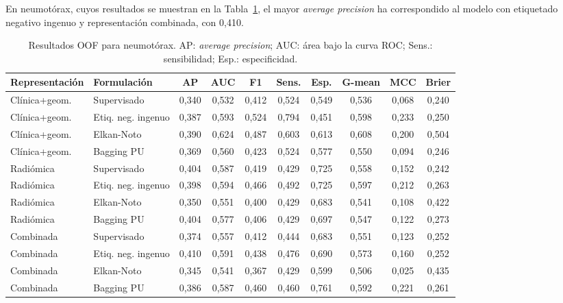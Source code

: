 En neumotórax, cuyos resultados se muestran en la Tabla~\ref{tab:pu_resultados_neumotorax}, el mayor \textit{average precision} ha correspondido al modelo con etiquetado negativo ingenuo y representación combinada, con 0,410.

\begin{table}[!htbp]
\centering
\caption{Resultados OOF para neumotórax. AP: \textit{average precision}; AUC: área bajo la curva ROC; Sens.: sensibilidad; Esp.: especificidad.}
\label{tab:pu_resultados_neumotorax}
\scriptsize
\begin{adjustbox}{max width=\textwidth}
\begin{tabular}{llcccccccc}
\toprule
\textbf{Representación} & \textbf{Formulación} & \textbf{AP} & \textbf{AUC} & \textbf{F1} & \textbf{Sens.} & \textbf{Esp.} & \textbf{G-mean} & \textbf{MCC} & \textbf{Brier} \\
\midrule
Clínica+geom. & Supervisado & 0,340 & 0,532 & 0,412 & 0,524 & 0,549 & 0,536 & 0,068 & 0,240 \\
Clínica+geom. & Etiq. neg. ingenuo & 0,387 & 0,593 & 0,524 & 0,794 & 0,451 & 0,598 & 0,233 & 0,250 \\
Clínica+geom. & Elkan-Noto & 0,390 & 0,624 & 0,487 & 0,603 & 0,613 & 0,608 & 0,200 & 0,504 \\
Clínica+geom. & Bagging PU & 0,369 & 0,560 & 0,423 & 0,524 & 0,577 & 0,550 & 0,094 & 0,246 \\
\midrule
Radiómica & Supervisado & 0,404 & 0,587 & 0,419 & 0,429 & 0,725 & 0,558 & 0,152 & 0,242 \\
Radiómica & Etiq. neg. ingenuo & 0,398 & 0,594 & 0,466 & 0,492 & 0,725 & 0,597 & 0,212 & 0,263 \\
Radiómica & Elkan-Noto & 0,350 & 0,551 & 0,400 & 0,429 & 0,683 & 0,541 & 0,108 & 0,422 \\
Radiómica & Bagging PU & 0,404 & 0,577 & 0,406 & 0,429 & 0,697 & 0,547 & 0,122 & 0,273 \\
\midrule
Combinada & Supervisado & 0,374 & 0,557 & 0,412 & 0,444 & 0,683 & 0,551 & 0,123 & 0,252 \\
Combinada & Etiq. neg. ingenuo & 0,410 & 0,591 & 0,438 & 0,476 & 0,690 & 0,573 & 0,160 & 0,252 \\
Combinada & Elkan-Noto & 0,345 & 0,541 & 0,367 & 0,429 & 0,599 & 0,506 & 0,025 & 0,435 \\
Combinada & Bagging PU & 0,386 & 0,587 & 0,460 & 0,460 & 0,761 & 0,592 & 0,221 & 0,261 \\
\bottomrule
\end{tabular}
\end{adjustbox}
\end{table}

